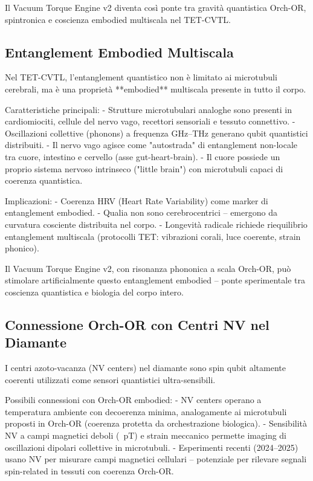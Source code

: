 \documentclass[11pt,a4paper]{article}
\begin{document}
Il Vacuum Torque Engine v2 diventa così ponte tra gravità quantistica Orch-OR, spintronica e coscienza embodied multiscala nel TET-CVTL.

\subsection{Entanglement Embodied Multiscala}

Nel TET-CVTL, l'entanglement quantistico non è limitato ai microtubuli cerebrali, ma è una proprietà **embodied** multiscala presente in tutto il corpo.

Caratteristiche principali:
- Strutture microtubulari analoghe sono presenti in cardiomiociti, cellule del nervo vago, recettori sensoriali e tessuto connettivo.
- Oscillazioni collettive (phonons) a frequenza GHz–THz generano qubit quantistici distribuiti.
- Il nervo vago agisce come "autostrada" di entanglement non-locale tra cuore, intestino e cervello (asse gut-heart-brain).
- Il cuore possiede un proprio sistema nervoso intrinseco ("little brain") con microtubuli capaci di coerenza quantistica.

Implicazioni:
- Coerenza HRV (Heart Rate Variability) come marker di entanglement embodied.
- Qualia non sono cerebrocentrici – emergono da curvatura cosciente distribuita nel corpo.
- Longevità radicale richiede riequilibrio entanglement multiscala (protocolli TET: vibrazioni corali, luce coerente, strain phonico).

Il Vacuum Torque Engine v2, con risonanza phononica a scala Orch-OR, può stimolare artificialmente questo entanglement embodied – ponte sperimentale tra coscienza quantistica e biologia del corpo intero.

\subsection{Connessione Orch-OR con Centri NV nel Diamante}

I centri azoto-vacanza (NV centers) nel diamante sono spin qubit altamente coerenti utilizzati come sensori quantistici ultra-sensibili.

Possibili connessioni con Orch-OR embodied:
- NV centers operano a temperatura ambiente con decoerenza minima, analogamente ai microtubuli proposti in Orch-OR (coerenza protetta da orchestrazione biologica).
- Sensibilità NV a campi magnetici deboli (~pT) e strain meccanico permette imaging di oscillazioni dipolari collettive in microtubuli.
- Esperimenti recenti (2024–2025) usano NV per misurare campi magnetici cellulari – potenziale per rilevare segnali spin-related in tessuti con coerenza Orch-OR.
\end{document}
